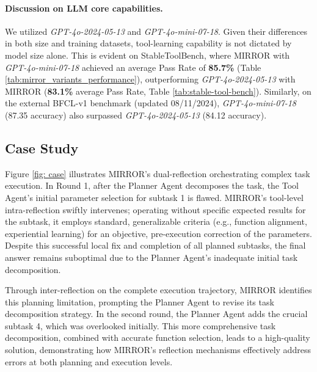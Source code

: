 \documentclass{article}
\begin{document}
\paragraph{Discussion on LLM core capabilities.} 
We utilized \textsl{GPT-4o-2024-05-13} and \textsl{GPT-4o-mini-07-18}. Given their differences in both size and training datasets, tool-learning capability is not dictated by model size alone. This is evident on StableToolBench, where MIRROR with \textsl{GPT-4o-mini-07-18} achieved an average Pass Rate of \textbf{85.7\%} (Table \ref{tab:mirror_variants_performance}), outperforming \textsl{GPT-4o-2024-05-13} with MIRROR (\textbf{83.1\%} average Pass Rate, Table \ref{tab:stable-tool-bench}). Similarly, on the external BFCL-v1 benchmark \cite{berkeley-function-calling-leaderboard} (updated 08/11/2024), \textsl{GPT-4o-mini-07-18} (87.35 accuracy) also surpassed \textsl{GPT-4o-2024-05-13} (84.12 accuracy).




\subsection{Case Study}
Figure \ref{fig: case} illustrates MIRROR's dual-reflection orchestrating complex task execution. In Round 1, after the Planner Agent decomposes the task, the Tool Agent's initial parameter selection for subtask 1 is flawed. MIRROR's tool-level intra-reflection swiftly intervenes; operating without specific expected results for the subtask, it employs standard, generalizable criteria (e.g., function alignment, experiential learning) for an objective, pre-execution correction of the parameters. Despite this successful local fix and completion of all planned subtasks, the final answer remains suboptimal due to the Planner Agent's inadequate initial task decomposition.


Through inter-reflection on the complete execution trajectory, MIRROR identifies this planning limitation, prompting the Planner Agent to revise its task decomposition strategy. In the second round, the Planner Agent adds the crucial subtask 4, which was overlooked initially. This more comprehensive task decomposition, combined with accurate function selection, leads to a high-quality solution, demonstrating how MIRROR's reflection mechanisms effectively address errors at both planning and execution levels.



\end{document}
